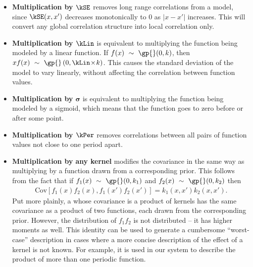\begin{itemize}
\item {\bf Multiplication by $\kSE$} removes long range correlations from a model, since $\kSE(x,x')$ decreases monotonically to 0 as $|x - x'|$ increases.
This will convert any global correlation structure into local correlation only.

\item {\bf Multiplication by $\kLin$} is equivalent to multiplying the function being modeled by a linear function.
If $f(x) \dist \gp{}(0, \kernel)$, then $xf(x) \dist \gp{}\left(0, \kLin \kerntimes k \right)$.
This causes the standard deviation of the model to vary linearly, without affecting the correlation between function values.

\item {\bf Multiplication by $\boldsymbol\sigma$} is equivalent to multiplying the function being modeled by a sigmoid, which means that the function goes to zero before or after some point.

\item {\bf Multiplication by $\kPer$}
removes correlations between all pairs of function values not close to one period apart.

\item {\bf Multiplication by any kernel}
modifies the covariance in the same way as multiplying by a function drawn from a corresponding \gp{} prior.
This follows from the fact that if ${f_1(x) \dist \gp{}(0, \kernel_1)}$ and ${f_2(x) \dist \gp{}(0, \kernel_2)}$ then
\begin{align}
{\textrm{Cov} \left[f_1(x)f_2(x), f_1(x')f_2(x') \right] = k_1(x,x')k_2(x,x')}.
\end{align}
Put more plainly, a \gp{} whose covariance is a product of kernels has the same covariance as a product of two functions, each drawn from the corresponding \gp{} prior.
However, the distribution of $f_1 f_2$ is not \gp{} distributed -- it has higher moments as well.
This identity can be used to generate a cumbersome ``worst-case'' description in cases where a more concise description of the effect of a kernel is not known.
For example, it is used in our system to describe the product of more than one periodic function.
\end{itemize}

